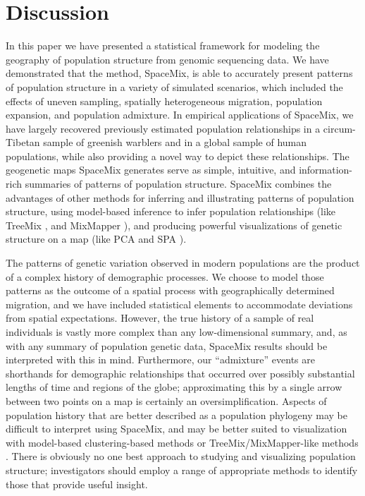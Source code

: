 \documentclass[10pt,letterpaper]{article}
\begin{document}
\section*{Discussion}
In this paper we have presented a statistical framework for modeling the geography of population structure from genomic sequencing data.
We have demonstrated that the method, SpaceMix, is able to accurately present patterns of population structure in a variety of simulated scenarios, which included the effects of uneven sampling, spatially heterogeneous migration, population expansion, and population admixture.  In empirical applications of SpaceMix, we have largely recovered previously estimated population relationships in a circum-Tibetan sample of greenish warblers and in a global sample of human populations, while also providing a novel way to depict these relationships.  The geogenetic maps SpaceMix generates serve as simple, intuitive, and information-rich summaries of patterns of population structure. 
SpaceMix combines the advantages of other methods for inferring and illustrating patterns of population structure, 
using model-based inference to infer population relationships (like TreeMix \cite{Treemix}, and MixMapper \cite{lipson_mixmapper_2013}), 
and producing powerful visualizations of genetic structure on a map (like PCA \cite{Patterson2006} and SPA \cite{yang_spatial_2014}).

The patterns of genetic variation observed in modern populations are the product of a complex history of demographic processes.  We choose to model those patterns as the outcome of a spatial process with geographically determined migration,
and we have included statistical elements to accommodate deviations from spatial expectations.
However, the true history of a sample of real individuals is vastly more complex than any low-dimensional summary,
and, as with any summary of population genetic data, 
SpaceMix results should be interpreted with this in mind.
Furthermore, our ``admixture'' events are shorthands for demographic relationships
that occurred over possibly substantial lengths of time and regions of the globe;
approximating this by a single arrow between two points on a map is certainly an oversimplification.
Aspects of population history that are better described as a population phylogeny may be difficult to interpret using SpaceMix,
and may be better suited to visualization with model-based clustering-based methods \cite{STRUCTURE} or TreeMix/MixMapper-like methods \cite{Treemix,lipson_mixmapper_2013}.  
There is obviously no one best approach to studying and visualizing population structure;
investigators should employ a range of appropriate methods to identify those that provide useful insight. 
\end{document}
